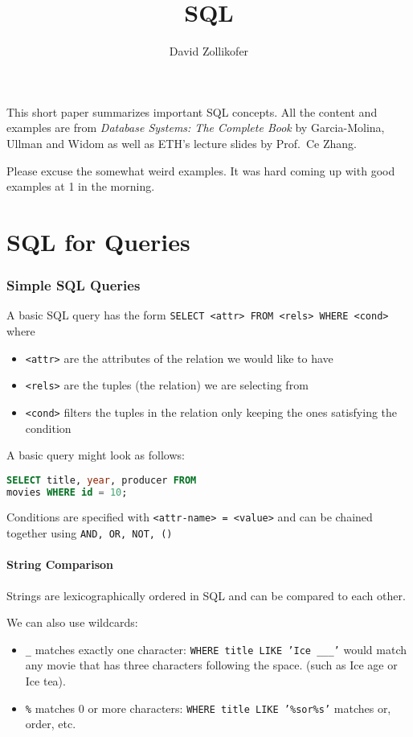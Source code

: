 \documentclass{sciposter}
\title{\huge{SQL}}
\author{\Large David Zollikofer}
\renewcommand{\t}[1]{\texttt{#1}}
\begin{document}
\maketitle

\begin{multicols}{3}

This short paper summarizes important SQL concepts. All the content and examples are from \textit{Database Systems: The Complete Book} by Garcia-Molina, Ullman and Widom as well as ETH's lecture slides by Prof.\ Ce Zhang.

Please excuse the somewhat weird examples. It was hard coming up with good examples at 1 in the morning.


\part{SQL for Queries}

\section*{Simple SQL Queries}

A basic SQL query has the form \t{SELECT <attr> FROM <rels> WHERE <cond>} where 
\begin{itemize}
	\item \t{<attr>} are the attributes of the relation we would like to have
	\item \t{<rels>} are the tuples (the relation) we are selecting from
	\item \t{<cond>} filters the tuples in the relation only keeping the ones satisfying the condition
\end{itemize}

A basic query might look as follows:

\begin{lstlisting}[language=SQL]
SELECT title, year, producer FROM
movies WHERE id = 10;
\end{lstlisting}

Conditions are specified with \t{<attr-name> = <value>} and can be chained together using \t{AND, OR, NOT, ()}

\subsection*{String Comparison}

Strings are lexicographically ordered in SQL and can be compared to each other.

We can also use wildcards:
\begin{itemize}
	\item \t{\_} matches exactly one character: \t{WHERE title LIKE 'Ice \_\_\_'} would match any movie that has three characters following the space. (such as Ice age or Ice tea).
	\item\t{\%} matches 0 or more characters: \t{WHERE title LIKE '\%sor\%s'} matches or, order, etc.
\end{itemize}



\end{multicols}
\end{document}
